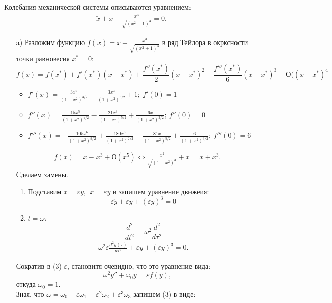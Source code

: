 \documentclass[12pt]{article}
\begin{document}
    \pagestyle{fancy} 
        \fancyhead{}
    \fancyfoot{} 

    Колебания механической системы описываются уравнением:
    \begin{eqnarray}
        \ddot{x} + x+ \frac{x^3}{\sqrt{{ (x^2 + 1)^3 }}} = 0.
    \end{eqnarray}
    \begin{itemize}
        \item[a)]
        Разложим функцию $f(x)= x+ \frac{x^3}{\sqrt{{ (x^2 + 1)^3 }}}$ в ряд Тейлора в окрксности точки равновесия $x^*=0$:
        $$f(x)= f(x^*)+f'(x^*)(x-x^*)+\frac{f''(x^*)}{2}(x-x^*)^2+\frac{f'''(x^*)}{6}(x-x^*)^3+О((x-x^*)^4$$
        \begin{itemize}
            \item $f'(x)=\frac{3x^2}{(1+x^2)^{3/2}}-\frac{3x^4}{(1+x^2)^{5/2}}+1;\:f'(0)=1$
            \item $f''(x)=\frac{15x^5}{(1+x^2)^{7/2}}-\frac{21x^3}{(1+x^2)^{5/2}}+\frac{6x}{(1+x^2)^{3/2}};\:f''(0)=0$
            \item $f'''(x)=-\frac{105x^6}{(1+x^2)^{9/2}}+\frac{180x^3}{(1+x^2)^{7/2}}-\frac{81x}{(1+x^2)^{5/2}}+\frac{6}{(1+x^2)^{3/2}};\:f'''(0)=6$
        \end{itemize}
        \begin{eqnarray} f(x)=x-x^3+О(x^5)\Leftrightarrow \frac{x^2}{\sqrt{{ (1+x^2)^3 }}}+x=x+x^3.\end{eqnarray}
        Сделаем замены.
        \begin{enumerate}
            \item Подставим $x=\varepsilon y,\:\:\ddot x = \varepsilon \ddot y$ и запишем уравнение движеия:
            $$\varepsilon \ddot y+\varepsilon y+(\varepsilon y)^3=0$$
            \item $t=\omega \tau$
            $$\frac{d^2}{dt^2}=\omega^2\frac{d^2}{d\tau^2}$$
            \begin{eqnarray}\omega^2\varepsilon\frac{d^2y(\tau)}{d\tau^2}+\varepsilon y+(\varepsilon y)^3=0.\end{eqnarray}
        \end{enumerate}
        Сократив в (3) $\varepsilon$, становитя очевидно, что это уравнение вида:
        $$\omega^2y''+\omega_0y=\varepsilon f(y),$$
        откуда $\omega_0=1$.\\
        Зная, что $\omega=\omega_0+\varepsilon\omega_1+\varepsilon^2\omega_2+\varepsilon^3\omega_3$ запишем (3) в виде:

\end{itemize}
\end{document}
